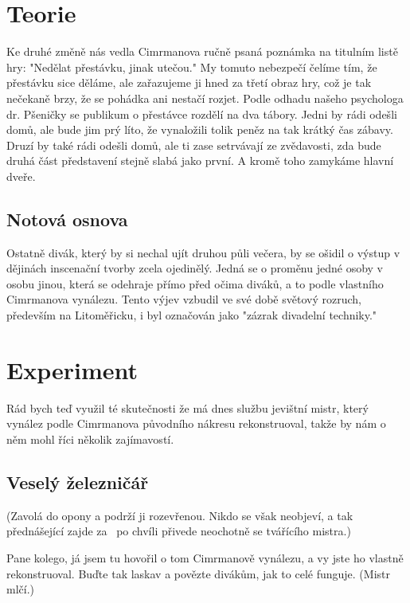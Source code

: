 \documentclass[11pt]{article}
\begin{document}
\section{Teorie}
Ke druhé změně nás vedla Cimrmanova ručně psaná poznámka na titulním listě hry: "Nedělat přestávku, jinak utečou." My tomuto nebezpečí čelíme tím, že přestávku sice děláme, ale zařazujeme ji hned za třetí obraz hry, což je tak nečekaně brzy, že se pohádka ani nestačí rozjet. Podle odhadu našeho psychologa dr. Pšeničky se publikum o přestávce rozdělí na dva tábory. Jedni by rádi odešli domů, ale bude jim prý líto, že vynaložili tolik peněz na tak krátký čas zábavy. Druzí by také rádi odešli domů, ale ti zase setrvávají ze zvědavosti, zda bude druhá část představení stejně slabá jako první. A kromě toho zamykáme hlavní dveře.


\subsection{Notová osnova}
Ostatně divák, který by si nechal ujít druhou půli večera, by se ošidil o výstup v dějinách inscenační tvorby zcela ojedinělý. Jedná se o proměnu jedné osoby v osobu jinou, která se odehraje přímo před očima diváků, a to podle vlastního Cimrmanova vynálezu. Tento výjev vzbudil ve své době světový rozruch, především na Litoměřicku, i byl označován jako "zázrak divadelní techniky."


\section{Experiment}
Rád bych teď využil té skutečnosti %
že má dnes službu jevištní mistr, který vynález podle Cimrmanova původního nákresu rekonstruoval, takže by nám o něm mohl říci několik zajímavostí. 

\subsection{Veselý železničář}
(Zavolá do opony a podrží ji rozevřenou. Nikdo se však neobjeví, a tak přednášející zajde za~%
po chvíli přivede neochotně se tvářícího mistra.)

Pane kolego, já jsem tu hovořil o tom Cimrmanově vynálezu, a vy jste ho vlastně rekonstruoval. Buďte tak laskav a povězte divákům, jak to celé funguje. (Mistr mlčí.)
\end{document}
